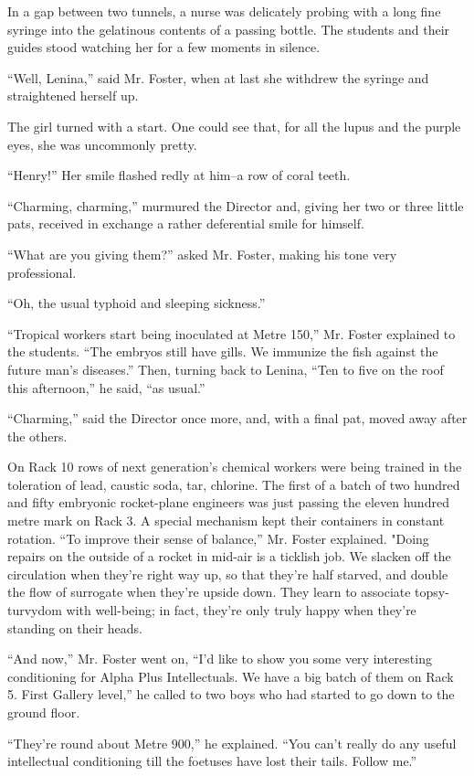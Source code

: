 \documentclass[12pt]{report}
\begin{document}
In a gap between two tunnels, a nurse was delicately probing with a long
fine syringe into the gelatinous contents of a passing bottle. The
students and their guides stood watching her for a few moments in
silence.

``Well, Lenina,'' said Mr. Foster, when at last she withdrew the syringe
and straightened herself up.

The girl turned with a start. One could see that, for all the lupus and
the purple eyes, she was uncommonly pretty.

``Henry!'' Her smile flashed redly at him--a row of coral teeth.

``Charming, charming,'' murmured the Director and, giving her two or
three little pats, received in exchange a rather deferential smile for
himself.

``What are you giving them?'' asked Mr. Foster, making his tone very
professional.

``Oh, the usual typhoid and sleeping sickness.''

``Tropical workers start being inoculated at Metre 150,'' Mr. Foster
explained to the students. ``The embryos still have gills. We immunize
the fish against the future man's diseases.'' Then, turning back to
Lenina, ``Ten to five on the roof this afternoon,'' he said, ``as
usual.''

``Charming,'' said the Director once more, and, with a final pat, moved
away after the others.

On Rack 10 rows of next generation's chemical workers were being trained
in the toleration of lead, caustic soda, tar, chlorine. The first of a
batch of two hundred and fifty embryonic rocket-plane engineers was just
passing the eleven hundred metre mark on Rack 3. A special mechanism
kept their containers in constant rotation. ``To improve their sense of
balance,'' Mr. Foster explained. "Doing repairs on the outside of a
rocket in mid-air is a ticklish job. We slacken off the circulation when
they're right way up, so that they're half starved, and double the flow
of surrogate when they're upside down. They learn to associate
topsy-turvydom with well-being; in fact, they're only truly happy when
they're standing on their heads.

``And now,'' Mr. Foster went on, ``I'd like to show you some very
interesting conditioning for Alpha Plus Intellectuals. We have a big
batch of them on Rack 5. First Gallery level,'' he called to two boys
who had started to go down to the ground floor.

``They're round about Metre 900,'' he explained. ``You can't really do
any useful intellectual conditioning till the foetuses have lost their
tails. Follow me.''
\end{document}

